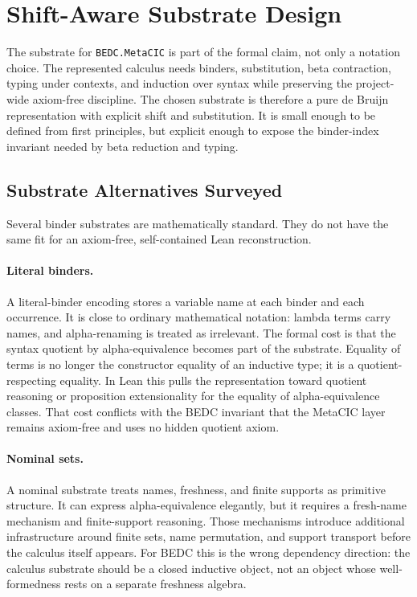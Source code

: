 \section{Shift-Aware Substrate Design}\label{sec:self-comp-substrate-shift-aware-design}

The substrate for \texttt{BEDC.MetaCIC} is part of the formal claim, not only a
notation choice. The represented calculus needs binders, substitution, beta
contraction, typing under contexts, and induction over syntax while preserving
the project-wide axiom-free discipline. The chosen substrate is therefore a
pure de Bruijn representation with explicit shift and substitution. It is
small enough to be defined from first principles, but explicit enough to expose
the binder-index invariant needed by beta reduction and typing.

\subsection{Substrate Alternatives Surveyed}
\label{subsec:substrate-alternatives-surveyed}

Several binder substrates are mathematically standard. They do not have the
same fit for an axiom-free, self-contained Lean reconstruction.

\paragraph{Literal binders.}
A literal-binder encoding stores a variable name at each binder and each
occurrence. It is close to ordinary mathematical notation: lambda terms carry
names, and alpha-renaming is treated as irrelevant. The formal cost is that the
syntax quotient by alpha-equivalence becomes part of the substrate. Equality of
terms is no longer the constructor equality of an inductive type; it is a
quotient-respecting equality. In Lean this pulls the representation toward
quotient reasoning or proposition extensionality for the equality of
alpha-equivalence classes. That cost conflicts with the BEDC invariant that the
MetaCIC layer remains axiom-free and uses no hidden quotient axiom.

\paragraph{Nominal sets.}
A nominal substrate treats names, freshness, and finite supports as primitive
structure. It can express alpha-equivalence elegantly, but it requires a
fresh-name mechanism and finite-support reasoning. Those mechanisms introduce
additional infrastructure around finite sets, name permutation, and support
transport before the calculus itself appears. For BEDC this is the wrong
dependency direction: the calculus substrate should be a closed inductive
object, not an object whose well-formedness rests on a separate freshness
algebra.

